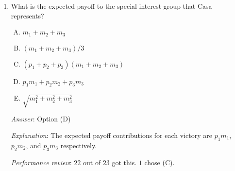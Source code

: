 \documentclass[10pt]{amsart}
\begin{document}
\begin{enumerate}
  {\em Answer}: Option (A)

  {\em Explanation}: This follows from the law of constant proportions
  in chemistry! Basically, the amounts of gain/loss in each coordinate
  are fixed in proportion based on the stoichiometry of the reaction.

  {\em Performance review}: $10$ out of $23$ got this correct. $10$
 chose (B), $2$ chose (D), $1$ chose (C).

  {\em Lobbying special}: Casa is a lobbyist for a special interest
  group. There are three politicians $P_1,P_2,P_3$ competing for a
  general election. Casa has computed that the probabilities of the
  politicians winning are $p_1$ for $P_1$, $p_2$ for $P_2$, and $p_3$
  for $P_3$, with $p_1,p_2,p_3 \in [0,1]$ and $p_1 + p_2 + p_3 =
  1$. Casa estimates a payoff of $m_1$ money units to her special
  interest group if $P_1$ wins, $m_2$ money units if $P_2$ wins, and
  $m_3$ money units if $P_3$ wins. (These payoffs may be in terms of
  passage of favorable laws, repeal of unfavorable laws, or
  enforcement of laws unfavorable to competitors).

\item What is the expected payoff to the special interest group that
  Casa represents?

  \begin{enumerate}[(A)]
  \item $m_1 + m_2 + m_3$
  \item $(m_1 + m_2 + m_3)/3$
  \item $(p_1 + p_2 + p_3)(m_1 + m_2 + m_3)$
  \item $p_1m_1 + p_2m_2 + p_3m_3$
  \item $\sqrt{m_1^2 + m_2^2 + m_3^2}$
  \end{enumerate}

  {\em Answer}: Option (D)

  {\em Explanation}: The expected payoff contributions for each
  victory are $p_1m_1$, $p_2m_2$, and $p_3m_3$ respectively.

  {\em Performance review}: $22$ out of $23$ got this. $1$ chose (C).


\end{enumerate}
\end{document}

